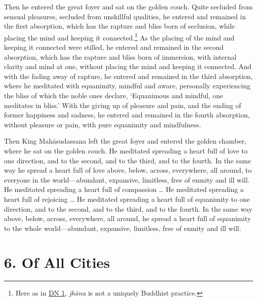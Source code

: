 \documentclass[12pt,openany]{book}%
\begin{document}
Then he entered the great foyer and sat on the golden couch. Quite secluded from sensual pleasures, secluded from unskillful qualities, he entered and remained in the first absorption, which has the rapture and bliss born of seclusion, while placing the mind and keeping it connected.\footnote{Here as in \href{https://suttacentral.net/dn1/en/sujato}{DN 1}, \textit{\textsanskrit{jhāna}} is not a uniquely Buddhist practice. } As the placing of the mind and keeping it connected were stilled, he entered and remained in the second absorption, which has the rapture and bliss born of immersion, with internal clarity and mind at one, without placing the mind and keeping it connected. And with the fading away of rapture, he entered and remained in the third absorption, where he meditated with equanimity, mindful and aware, personally experiencing the bliss of which the noble ones declare, ‘Equanimous and mindful, one meditates in bliss.’ With the giving up of pleasure and pain, and the ending of former happiness and sadness, he entered and remained in the fourth absorption, without pleasure or pain, with pure equanimity and mindfulness. 

Then King \textsanskrit{Mahāsudassana} left the great foyer and entered the golden chamber, where he sat on the golden couch. He meditated spreading a heart full of love to one direction, and to the second, and to the third, and to the fourth. In the same way he spread a heart full of love above, below, across, everywhere, all around, to everyone in the world—abundant, expansive, limitless, free of enmity and ill will. He meditated spreading a heart full of compassion … He meditated spreading a heart full of rejoicing … He meditated spreading a heart full of equanimity to one direction, and to the second, and to the third, and to the fourth. In the same way above, below, across, everywhere, all around, he spread a heart full of equanimity to the whole world—abundant, expansive, limitless, free of enmity and ill will. 

\section*{6. Of All Cities }
\end{document}
